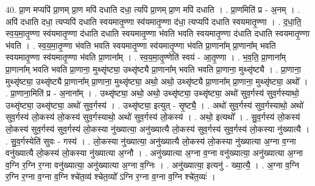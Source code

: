 \documentclass[17pt]{extarticle}
\begin{document}
40. प्रा॒ण मप्यपि॑ प्रा॒णम् प्रा॒ण मपि॑ दधाति दधा॒ त्यपि॑ प्रा॒णम् प्रा॒ण मपि॑ दधाति । . प्रा॒णमिति॑ प्र - अ॒नम् । . अपि॑ दधाति दधा॒ त्यप्यपि॑ दधाति स्वयमातृ॒ण्णा स्व॑यमातृ॒ण्णा द॑धा॒ त्यप्यपि॑ दधाति स्वयमातृ॒ण्णा । . द॒धा॒ति॒ स्व॒य॒मा॒तृ॒ण्णा स्व॑यमातृ॒ण्णा द॑धाति दधाति स्वयमातृ॒ण्णा भ॑वति भवति स्वयमातृ॒ण्णा द॑धाति दधाति स्वयमातृ॒ण्णा भ॑वति । . स्व॒य॒मा॒तृ॒ण्णा भ॑वति भवति स्वयमातृ॒ण्णा स्व॑यमातृ॒ण्णा भ॑वति प्रा॒णाना᳚म् प्रा॒णाना᳚म् भवति स्वयमातृ॒ण्णा स्व॑यमातृ॒ण्णा भ॑वति प्रा॒णाना᳚म् । . स्व॒य॒मा॒तृ॒ण्णेति॑ स्वयं - आ॒तृ॒ण्णा । . भ॒व॒ति॒ प्रा॒णाना᳚म् प्रा॒णाना᳚म् भवति भवति प्रा॒णाना॒ मुथ्सृ॑ष्ट्या॒ उथ्सृ॑ष्ट्यै प्रा॒णाना᳚म् भवति भवति प्रा॒णाना॒ मुथ्सृ॑ष्ट्यै । . प्रा॒णाना॒ मुथ्सृ॑ष्ट्या॒ उथ्सृ॑ष्ट्यै प्रा॒णाना᳚म् प्रा॒णाना॒ मुथ्सृ॑ष्ट्या॒ अथो॒ अथो॒ उथ्सृ॑ष्ट्यै प्रा॒णाना᳚म् प्रा॒णाना॒ मुथ्सृ॑ष्ट्या॒ अथो᳚ । . प्रा॒णाना॒मिति॑ प्र - अ॒नाना᳚म् । . उथ्सृ॑ष्ट्या॒ अथो॒ अथो॒ उथ्सृ॑ष्ट्या॒ उथ्सृ॑ष्ट्या॒ अथो॑ सुव॒र्गस्य॑ सुव॒र्गस्याथो॒ उथ्सृ॑ष्ट्या॒ उथ्सृ॑ष्ट्या॒ अथो॑ सुव॒र्गस्य॑ । . उथ्सृ॑ष्ट्या॒ इत्युत् - सृ॒ष्ट्यै॒ । . अथो॑ सुव॒र्गस्य॑ सुव॒र्गस्याथो॒ अथो॑ सुव॒र्गस्य॑ लो॒कस्य॑ लो॒कस्य॑ सुव॒र्गस्याथो॒ अथो॑ सुव॒र्गस्य॑ लो॒कस्य॑ । . अथो॒ इत्यथो᳚ । . सु॒व॒र्गस्य॑ लो॒कस्य॑ लो॒कस्य॑ सुव॒र्गस्य॑ सुव॒र्गस्य॑ लो॒कस्या नु॑ख्यात्या॒ अनु॑ख्यात्यै लो॒कस्य॑ सुव॒र्गस्य॑ सुव॒र्गस्य॑ लो॒कस्या नु॑ख्यात्यै । . सु॒व॒र्गस्येति॑ सुवः - गस्य॑ । . लो॒कस्या नु॑ख्यात्या॒ अनु॑ख्यात्यै लो॒कस्य॑ लो॒कस्या नु॑ख्यात्या अ॒ग्ना व॒ग्ना वनु॑ख्यात्यै लो॒कस्य॑ लो॒कस्या नु॑ख्यात्या अ॒ग्नौ । . अनु॑ख्यात्या अ॒ग्ना व॒ग्ना वनु॑ख्यात्या॒ अनु॑ख्यात्या अ॒ग्ना व॒ग्नि र॒ग्नि र॒ग्ना वनु॑ख्यात्या॒ अनु॑ख्यात्या अ॒ग्ना व॒ग्निः । . अनु॑ख्यात्या॒ इत्यनु॑ - ख्या॒त्यै॒ । . अ॒ग्ना व॒ग्नि र॒ग्नि र॒ग्ना व॒ग्ना व॒ग्नि श्चे॑त॒व्य॑ श्चेत॒व्यो᳚ ऽग्नि र॒ग्ना व॒ग्ना व॒ग्नि श्चे॑त॒व्यः॑ । \newline
\end{document}
